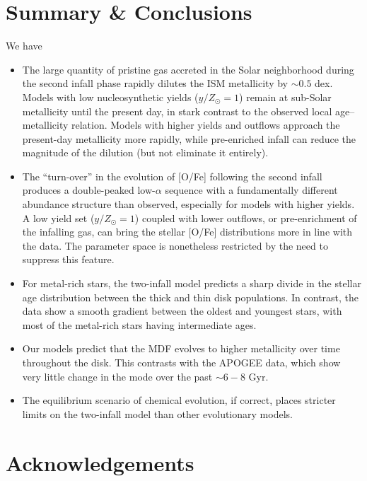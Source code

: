 \documentclass[twocolumn,twocolappendix,linenumbers]{aastex631}
\newcommand{\yZ}[1]{$y/Z_\odot=#1$}
\begin{document}
\section{Summary \& Conclusions}
\label{sec:conclusions}

We have 

\begin{itemize}
    \item The large quantity of pristine gas accreted in the Solar neighborhood during the second infall phase rapidly dilutes the ISM metallicity by $\sim0.5$ dex. Models with low nucleosynthetic yields (\yZ{1}) remain at sub-Solar metallicity until the present day, in stark contrast to the observed local age--metallicity relation. Models with higher yields and outflows approach the present-day metallicity more rapidly, while pre-enriched infall can reduce the magnitude of the dilution (but not eliminate it entirely). %
    \item The ``turn-over'' in the evolution of [O/Fe] following the second infall produces a double-peaked low-$\alpha$ sequence with a fundamentally different abundance structure than observed, especially for models with higher yields. A low yield set (\yZ{1}) coupled with lower outflows, or pre-enrichment of the infalling gas, can bring the stellar [O/Fe] distributions more in line with the data. The parameter space is nonetheless restricted by the need to suppress this feature.
    \item For metal-rich stars, the two-infall model predicts a sharp divide in the stellar age distribution between the thick and thin disk populations. In contrast, the data show a smooth gradient between the oldest and youngest stars, with most of the metal-rich stars having intermediate ages.
    \item Our models predict that the MDF evolves to higher metallicity over time throughout the disk. This contrasts with the APOGEE data, which show very little change in the mode over the past $\sim6-8$ Gyr.
    \item The equilibrium scenario of chemical evolution, if correct, places stricter limits on the two-infall model than other evolutionary models.
\end{itemize}

\section*{Acknowledgements}
\end{document}
